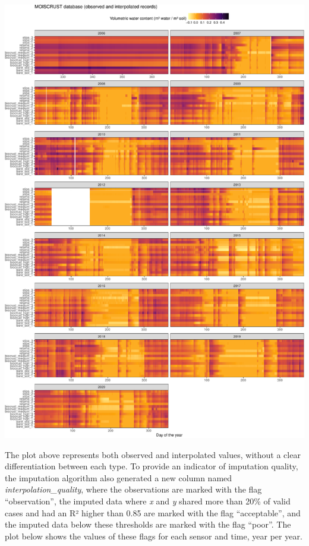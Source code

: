 \documentclass[
  table]{article}
\begin{document}
\includegraphics{moiscrust_files/figure-latex/unnamed-chunk-29-1.pdf}

The plot above represents both observed and interpolated values, without
a clear differentiation between each type. To provide an indicator of
imputation quality, the imputation algorithm also generated a new column
named \emph{interpolation\_quality}, where the observations are marked
with the flag ``observation'', the imputed data where \emph{x} and
\emph{y} shared more than 20\% of valid cases and had an R² higher than
0.85 are marked with the flag ``acceptable'', and the imputed data below
these thresholds are marked with the flag ``poor''. The plot below shows
the values of these flags for each sensor and time, year per year.
\end{document}
